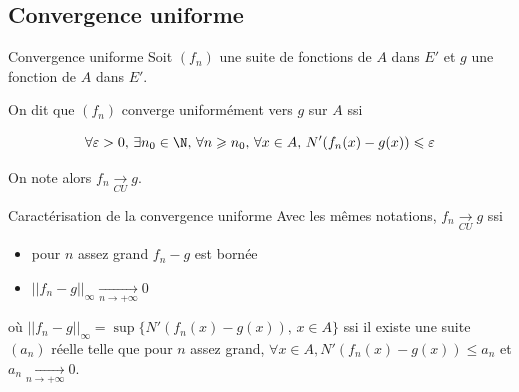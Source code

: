 \restaurergeometrie

\subsection{Convergence uniforme}

\begin{definition}{Convergence uniforme}{}
    Soit $(f_n)$ une suite de fonctions de $A$ dans $E'$ et $g$ une fonction de $A$ dans $E'$.

    On dit que $(f_n)$ converge uniformément vers $g$ sur $A$ ssi 
    
    $$\forall \varepsilon >0, \, \exists n_0 \in \N, \, \forall n \geqslant n_0, \, \forall x \in A, \, N'(f_n(x) - g(x) ) \leqslant \varepsilon$$

    On note alors $f_n \xrightarrow[CU]{} g$.
\end{definition}

\begin{proposition}{Caractérisation de la convergence uniforme}{}
    Avec les mêmes notations, $f_n \xrightarrow[CU]{} g$ ssi 
    
    \begin{itemize}
        \item pour $n$ assez grand $f_n - g$ est bornée 
        \item $\displaystyle || f_n - g ||_{\infty} \xrightarrow[n\to +\infty]{} 0$
    \end{itemize}

    où $\displaystyle || f_n - g ||_{\infty} = \sup\{ N'(f_n(x) - g(x)), \, x \in A \}$
    ssi il existe une suite $(a_n)$ réelle telle que pour $n$ assez grand, 
    $\forall x \in A, N'(f_n(x) - g(x)) \leqslant a_n$ et $a_n \xrightarrow[n\to +\infty]{} 0$.
     
\end{proposition}


